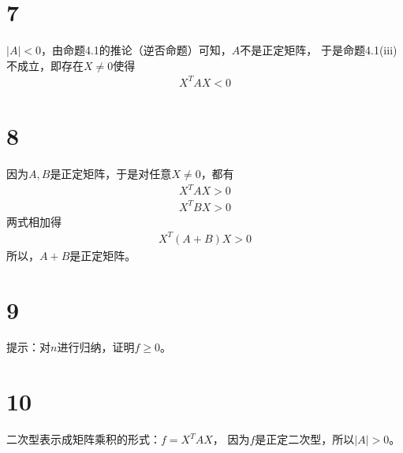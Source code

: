 \documentclass{article}
\begin{document}
\section*{7}

$|A| < 0$，由命题4.1的推论（逆否命题）可知，$A$不是正定矩阵，
于是命题4.1(iii)不成立，即存在$X \neq 0$使得
\begin{align*}
  X^T A X < 0
\end{align*}

\section*{8}

因为$A, B$是正定矩阵，于是对任意$X \neq 0$，都有
\begin{align*}
  X^T A X > 0 \\
  X^T B X > 0
\end{align*}
两式相加得
\begin{align*}
  X^T (A + B) X > 0
\end{align*}
所以，$A + B$是正定矩阵。

\section*{9}

提示：对$n$进行归纳，证明$f \geq 0$。

\section*{10}

二次型表示成矩阵乘积的形式：$f = X^T A X$，
因为$f$是正定二次型，所以$|A|>0$。
\end{document}
